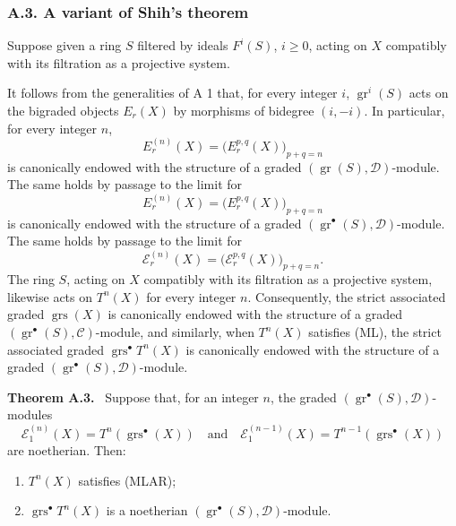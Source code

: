 \documentclass[11pt]{article}
\newenvironment{statement}[1]{\par\medskip\noindent\textbf{#1.}\ }{\par\medskip}
\providecommand{\gr}{\operatorname{gr}}
\providecommand{\gr}{\operatorname{gr}}
\providecommand{\gr}{\operatorname{gr}}
\providecommand{\grs}{\operatorname{grs}}
\begin{document}
\subsubsection*{A.3. A variant of Shih's theorem}
Suppose given a ring \(S\) filtered by ideals \(F^i(S)\), \(i\ge0\), acting on \(X\) compatibly with its filtration as a projective system.

It follows from the generalities of A 1 that, for every integer \(i\), \(\gr^i(S)\) acts on the bigraded objects \(E_r(X)\) by morphisms of bidegree \((i,-i)\). In particular, for every integer \(n\),
\[
E_r^{(n)}(X)=\bigl(E_r^{p,q}(X)\bigr)_{p+q=n}
\]
is canonically endowed with the structure of a graded \((\gr(S),\mathcal D)\)-module. The same holds by passage to the limit for
\[
E^{(n)}_r(X)=\bigl(E_r^{p,q}(X)\bigr)_{p+q=n}
\]
is canonically endowed with the structure of a graded \((\gr^\bullet(S),\mathcal D)\)-module. The same holds by passage to the limit for
\[
\mathcal E_r^{(n)}(X)=\bigl(\mathcal E_r^{p,q}(X)\bigr)_{p+q=n}.
\]
The ring \(S\), acting on \(X\) compatibly with its filtration as a projective system, likewise acts on \(T^n(X)\) for every integer \(n\). Consequently, the strict associated graded \(\grs(X)\) is canonically endowed with the structure of a graded \((\gr^\bullet(S),\mathcal C)\)-module, and similarly, when \(T^n(X)\) satisfies (ML), the strict associated graded \(\grs^\bullet T^n(X)\) is canonically endowed with the structure of a graded \((\gr^\bullet(S),\mathcal D)\)-module.

\begin{statement}{Theorem A.3}
Suppose that, for an integer \(n\), the graded \((\gr^\bullet(S),\mathcal D)\)-modules
\[
\mathcal E_1^{(n)}(X)=T^n(\grs^\bullet(X))
\quad\text{and}\quad
\mathcal E_1^{(n-1)}(X)=T^{n-1}(\grs^\bullet(X))
\]
are noetherian. Then:
\begin{enumerate}[label=\textup{(\roman*)}]
\item \(T^n(X)\) satisfies (MLAR);
\item \(\grs^\bullet T^n(X)\) is a noetherian \((\gr^\bullet(S),\mathcal D)\)-module.
\end{enumerate}
\end{statement}
\end{document}
